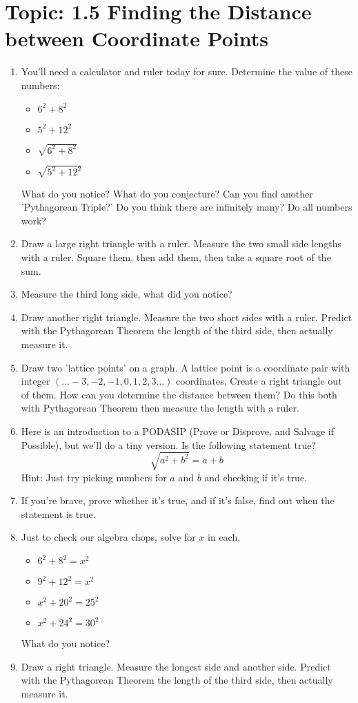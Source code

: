 \documentclass[12pt,letterpaper]{article}
\begin{document}
\section*{Topic: 1.5 Finding the Distance between Coordinate Points}
\begin{enumerate}
    \item You'll need a calculator and ruler today for sure. Determine the value of these numbers:
          \begin{itemize}
              \item $6^2+8^2$
              \item $5^2+12^2$
              \item $\sqrt{6^2+8^2}$
              \item $\sqrt{5^2+12^2}$
          \end{itemize}
          What do you notice? What do you conjecture? Can you find another 'Pythagorean Triple?' Do you think there are infinitely many? Do all numbers work?
    \item Draw a large right triangle with a ruler. Measure the two small side lengths with a ruler. Square them, then add them, then take a square root of the sum.
    \item Measure the third long side, what did you notice?
    \item Draw another right triangle. Measure the two short sides with a ruler. Predict with the Pythagorean Theorem the length of the third side, then actually measure it.
    \item Draw two 'lattice points' on a graph. A lattice point is a coordinate pair with integer $(\dots -3,-2,-1,0,1,2,3\dots)$ coordinates. Create a right triangle out of them. How can you determine the distance between them? Do this both with Pythagorean Theorem then measure the length with a ruler.
    \item Here is an introduction to a PODASIP (Prove or Disprove, and Salvage if Possible), but we'll do a tiny version.
          Is the following statement true?
          $$\sqrt{a^2+b^2}=a+b$$ Hint: Just try picking numbers for $a$ and $b$ and checking if it's true.
    \item If you're brave, prove whether it's true, and if it's false, find out when the statement is true.
    \item Just to check our algebra chops, solve for $x$ in each.
          \begin{itemize}
              \item $6^2+8^2=x^2$
              \item $9^2+12^2=x^2$
              \item $x^2+20^2=25^2$
              \item $x^2+24^2=30^2$
          \end{itemize}
          What do you notice?
    \item Draw a right triangle. Measure the longest side and another side. Predict with the Pythagorean Theorem the length of the third side, then actually measure it.
\end{enumerate}
\end{document}
